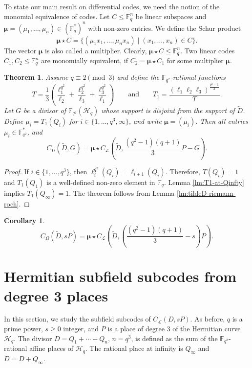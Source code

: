 \documentclass[11pt]{amsart}
\theoremstyle{plain}
\newtheorem{theorem}{Theorem}[section]
\newtheorem*{corollary}{Corollary}
\theoremstyle{definition}
\theoremstyle{remark}
\begin{document}
To state our main result on differential codes, we need the notion of the monomial equivalence of codes. Let $C \leq \mathbb{F}_q^n$ be linear subspaces and $\boldsymbol{\mu}=(\mu_1,\ldots,\mu_n) \in (\mathbb{F}_q^*)^n$ with non-zero entries. We define the Schur product
\[\boldsymbol{\mu} \star C = \{(\mu_1x_1, \ldots,\mu_nx_n) \mid (x_1,\ldots,x_n) \in C\}.\]
The vector $\boldsymbol{\mu}$ is also called a multiplier. Clearly, $\boldsymbol{\mu} \star C\leq \mathbb{F}_q^n$. Two linear codes $C_1,C_2 \leq \mathbb{F}_q^n$ are monomially equivalent, if $C_2=\boldsymbol{\mu} \star C_1$ for some multiplier $\boldsymbol{\mu}$. 

\begin{theorem}
Assume $q\equiv 2 \pmod3$ and define the $\mathbb{F}_{q^2}$-rational functions 
\[T=\frac{1}{3}\left(\frac{\ell_1^{q^2}}{\ell_2} + \frac{\ell_2^{q^2}}{\ell_3} + \frac{\ell_3^{q^2}}{\ell_1}\right) \qquad \text{and} \qquad T_1=\frac{(\ell_1\ell_{2}\ell_{3})^{\frac{q^2-1}{3}}}{T}.\]
Let $G$ be a divisor of $\mathbb{F}_{q^2}(\mathscr{H}_q)$ whose support is disjoint from the support of $\widetilde{D}$. Define $\mu_i=T_1(Q_i)$ for $i \in \{1,\ldots,q^3,\infty\}$, and write $\boldsymbol{\mu}=(\mu_i)$. Then all entries $\mu_i\in \mathbb{F}_{q^2}^*$, and
\[C_\Omega(\widetilde{D},G) = \boldsymbol{\mu} \star C_\mathscr{L}(\widetilde{D},\frac{(q^2-1)(q+1)}{3}P-G).\]
\end{theorem}
\begin{proof}
If $i\in \{1,\ldots,q^3\}$, then $\ell_i^{q^2}(Q_i)=\ell_{i+1}(Q_i)$. Therefore, $T(Q_i)=1$ and $T_1(Q_1)$ is a well-defined non-zero element in $\mathbb{F}_q$. Lemma \ref{lm:T1-at-Qinfty} implies $T_1(Q_\infty)=1$. The theorem follows from Lemma \ref{lm:tildeD-riemann-roch}. 
\end{proof}

\begin{corollary}
\[C_\Omega(\widetilde{D},sP) = \boldsymbol{\mu} \star C_\mathcal{L}\left(\widetilde{D},\left(\frac{(q^2-1)(q+1)}{3}-s\right)P\right).\]
\end{corollary}



\section{Hermitian subfield subcodes from degree 3 places \label{sec:subf}}

In this section, we study the subfield subcodes of $C_\mathcal{L}(D,sP)$. As before, $q$ is a prime power, $s\geq 0$ integer, and $P$ is a place of degree $3$ of the Hermitian curve $\mathscr{H}_q$. The divisor $D=Q_1+\cdots+Q_{n}$, $n=q^3$, is defined as the sum of the $\mathbb{F}_{q^2}$-rational affine places of $\mathscr{H}_q$. The rational place at infinity is $Q_\infty$ and $\widetilde{D}=D+Q_\infty$. 
\end{document}
